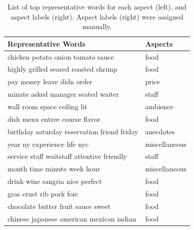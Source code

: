 \documentclass{article}
\begin{document}
\begin{table}[tbh!]
\begin{center}
\begin{tabular}[t]{l|l}
\hline
Representative Words & Aspects \\
\hline
chicken potato onion tomato sauce           & food          \\
highly grilled seared roasted shrimp        & food          \\
pay money leave didn order                  & price         \\
minute asked manager seated waiter          & staff         \\
wall room space ceiling lit                 & ambience      \\
dish menu entree course flavor              & food          \\
birthday saturday reservation friend friday & anecdotes     \\
year ny experience life nyc                 & miscellaneous \\
service staff waitstaff attentive friendly  & staff         \\
month time minute week hour                 & miscellaneous \\
drink wine sangria nice perfect             & food          \\
gras crust rib pork foie                    & food          \\
chocolate butter fruit sauce sweet          & food          \\
chinese japanese american mexican indian    & food          \\
\hline
\end{tabular}
\caption{List of top representative words for each aspect (left), and aspect labels (right). Aspect labels (right) were assigned manually.}
\label{tab:aspects}
\end{center}
\end{table}
\end{document}
